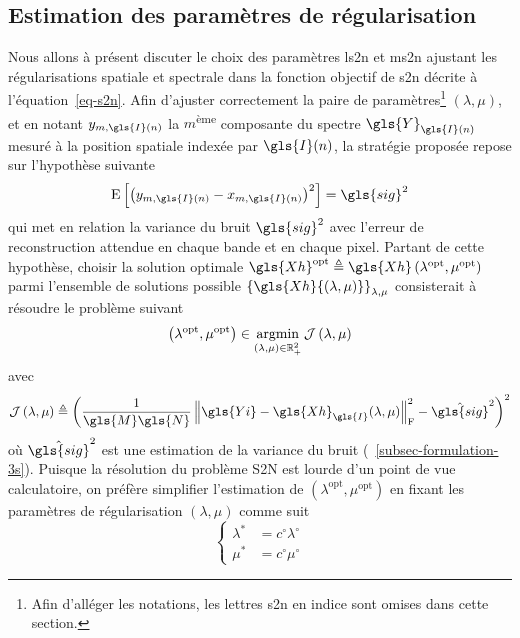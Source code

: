 \subsection{Estimation des paramètres de régularisation}\label{sec-s2n-param-tuning}

Nous allons à présent discuter le choix des paramètres \gls{ls2n} et \gls{ms2n} ajustant les régularisations spatiale et spectrale dans la fonction objectif de \gls{s2n} décrite à l'équation~\eqref{eq-s2n}. Afin d'ajuster correctement la paire de paramètres\footnote{Afin d'alléger les notations, les lettres \gls{s2n} en indice sont omises dans cette section.} $(\lambda,\mu)$, et en notant $y_{m,\gls{I}(n)}$ la $m$\textsuperscript{ème} composante du spectre  $\gls{Y}_{\gls{I}(n)}$ mesuré à la position spatiale indexée par $\gls{I}(n)$, la stratégie proposée repose sur l'hypothèse suivante
\begin{equation}
    \mathrm{E}\left[ \left(  y_{m,\gls{I}(n)} - x_{m,\gls{I}(n)}  \right)^2 \right] = \gls{sig}^2
\end{equation}
qui met en relation la variance du bruit $\gls{sig}^2$ avec l'erreur de reconstruction attendue en chaque bande et en chaque pixel.
%
Partant de cette hypothèse, choisir la solution optimale
$\gls{Xh}^{\textrm{opt}} \triangleq \gls{Xh}\left(\lambda^{\textrm{opt}}, \mu^{\textrm{opt}}\right)$
parmi l'ensemble de solutions possible 
$\left\{\gls{Xh}{\left(\lambda,\mu\right)}\right\}_{\lambda,\mu}$
consisterait à résoudre le problème suivant
\begin{equation}
\left(\lambda^{\textrm{opt}},\mu^{\textrm{opt}}\right) \in \operatornamewithlimits{argmin}_{(\lambda,\mu)\in\mathbb{R}_+^2} \mathcal{J}\left(\lambda,\mu\right)
\end{equation}
avec
\begin{equation}
\mathcal{J}\left(\lambda,\mu\right) \triangleq \left(\frac{1}{\gls{M}\gls{N}}\left\|\gls{Yi}-\gls{Xh}_{\gls{I}}{(\lambda,\mu)}\right\|_{\mathrm{F}}^2-\hat{\gls{sig}}^2\right)^2
\end{equation}
où $\hat{\gls{sig}}^2$ est une estimation de la variance du bruit (\cf\ \cref{subsec-formulation-3s}). Puisque la résolution du problème S2N est lourde d'un point de vue calculatoire, on préfère simplifier l'estimation de $\left(\lambda^{\textrm{opt}},\mu^{\textrm{opt}}\right)$ en fixant les paramètres de régularisation $(\lambda, \mu)$ comme suit
\begin{equation*}
\left\{
\begin{array}{cc}
\lambda^* &= c^\circ \lambda^{\circ} \\
\mu^*     &= c^\circ \mu^{\circ}
\end{array}
\right.
\end{equation*}
